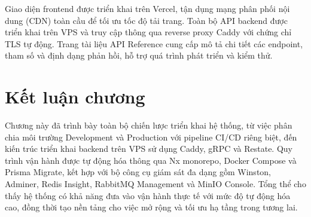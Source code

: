 \noindent Giao diện frontend được triển khai trên Vercel, tận dụng mạng phân phối nội dung (CDN) toàn cầu để tối ưu tốc độ tải trang. Toàn bộ API backend được triển khai trên VPS và truy cập thông qua reverse proxy Caddy với chứng chỉ TLS tự động. Trang tài liệu API Reference cung cấp mô tả chi tiết các endpoint, tham số và định dạng phản hồi, hỗ trợ quá trình phát triển và kiểm thử.

\section{Kết luận chương}
Chương này đã trình bày toàn bộ chiến lược triển khai hệ thống, từ việc phân chia môi trường Development và Production với pipeline CI/CD riêng biệt, đến kiến trúc triển khai backend trên VPS sử dụng Caddy, gRPC và Restate. Quy trình vận hành được tự động hóa thông qua Nx monorepo, Docker Compose và Prisma Migrate, kết hợp với bộ công cụ giám sát đa dạng gồm Winston, Adminer, Redis Insight, RabbitMQ Management và MinIO Console. Tổng thể cho thấy hệ thống có khả năng đưa vào vận hành thực tế với mức độ tự động hóa cao, đồng thời tạo nền tảng cho việc mở rộng và tối ưu hạ tầng trong tương lai.
